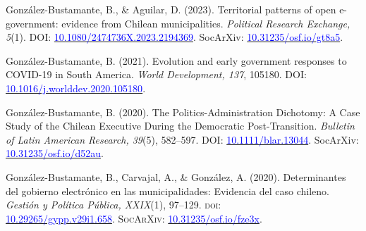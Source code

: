 \begin{publications}
\begin{benumerate}{13}
\item{González-Bustamante, B., \& Aguilar, D. (2023). Territorial patterns of open e-government: evidence from Chilean municipalities. {\itshape Political Research Exchange, 5}(1). DOI: \href{https://doi.org/10.1080/2474736X.2023.2194369}{\textcolor{blue}{10.1080/2474736X.2023.2194369}}. SocArXiv: \href{https://doi.org/10.31235/osf.io/gt8a5}{\textcolor{blue}{10.31235/osf.io/gt8a5}}.}\vspace{1mm}

\item{González-Bustamante, B. (2021). Evolution and early government responses to COVID-19 in South America. {\itshape World Development, 137}, 105180. DOI: \href{https://doi.org/10.1016/j.worlddev.2020.105180}{\textcolor{blue}{10.1016/j.worlddev.2020.105180}}.}\vspace{1mm}


\item{González-Bustamante, B. (2020). The Politics-Administration Dichotomy: A Case Study of the Chilean Executive During the Democratic Post-Transition. {\itshape Bulletin of Latin American Research, 39}(5), 582--597. DOI: \href{https://doi.org/10.1111/blar.13044}{\textcolor{blue}{10.1111/blar.13044}}. SocArXiv: \href{https://doi.org/10.31235/osf.io/d52au}{\textcolor{blue}{10.31235/osf.io/d52au}}.}\vspace{1mm}

\item{González-Bustamante, B., Carvajal, A., \& González, A. (2020). Determinantes del gobierno electrónico en las municipalidades: Evidencia del caso chileno. {\itshape Gestión y Política Pública, XXIX}(1), 97--129. {\scshape doi:} \\ \href{http://dx.doi.org/10.29265/gypp.v29i1.658}{\textcolor{blue}{10.29265/gypp.v29i1.658}}. {\scshape \footnotesize SocArXiv:} \href{https://doi.org/10.31235/osf.io/fze3x}{\textcolor{blue}{10.31235/osf.io/fze3x}}.} \vspace{1mm}


\end{benumerate}
\end{publications}
